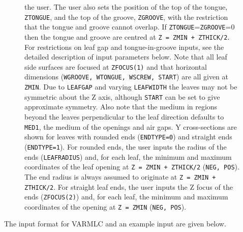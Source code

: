 \documentclass[12pt,twoside]{article}
\begin{document}
\begin{figure}[tp]
{the user.  The user also sets the position of the top of the tongue,
{\tt ZTONGUE},
and the top of the groove, {\tt ZGROOVE}, with the restriction that the tongue
and groove cannot overlap.  If {\tt ZTONGUE}={\tt ZGROOVE}=0 then
the tongue and groove are centred at {\tt Z = ZMIN + ZTHICK/2}.
For restrictions on leaf gap and tongue-in-groove inputs, see the detailed description
of input parameters below.
Note that all leaf side surfaces are focused at {\tt ZFOCUS(1)}
and that horizontal dimensions ({\tt WGROOVE, WTONGUE, WSCREW, START}) are all given
at {\tt ZMIN}.
Due to {\tt LEAFGAP} and varying {\tt LEAFWIDTH} the leaves may not be
symmetric about the Z axis, although {\tt START}
can be set to give approximate symmetry. Also note that the medium
in regions beyond the leaves perpendicular to the leaf direction defaults to {\tt MED1},
the medium of the openings and air gaps.  Y cross-sections are shown for leaves
with rounded ends ({\tt ENDTYPE=0}) and straight ends ({\tt ENDTYPE=1}).  For rounded
ends, the user inputs the radius of the ends ({\tt LEAFRADIUS}) and, for each leaf,
the minimum and maximum coordinates of the leaf opening at {\tt Z = ZMIN + ZTHICK/2}
({\tt NEG, POS}).  The end radius is always assumed to originate at
{\tt Z = ZMIN + ZTHICK/2}.  For straight leaf ends, the user inputs the Z focus of the
ends ({\tt ZFOCUS(2)}) and, for each leaf, the minimum and maximum coordinates of
the opening at {\tt Z = ZMIN} ({\tt NEG, POS}).}
\label{fig_VARMLCD}
\end{figure}


\clearpage

The input format for VARMLC and an example input are given below.
\begin{small}

\end{small}
\end{document}
